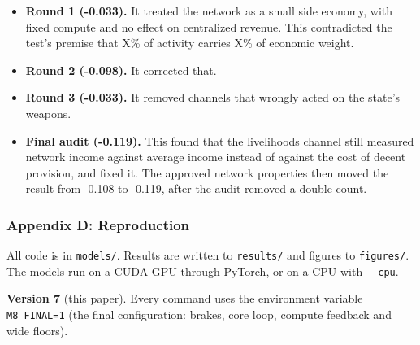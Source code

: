 \documentclass[
  10pt,
]{article}
\providecommand{\tightlist}{%
  \setlength{\itemsep}{0pt}\setlength{\parskip}{0pt}}
\begin{document}
\begin{itemize}
\tightlist
\item
  \textbf{Round 1 (-0.033).} It treated the network as a small side economy, with fixed compute and
  no effect on centralized revenue. This contradicted the test's premise that X\% of activity
  carries X\% of economic weight.
\item
  \textbf{Round 2 (-0.098).} It corrected that.
\item
  \textbf{Round 3 (-0.033).} It removed channels that wrongly acted on the state's weapons.
\item
  \textbf{Final audit (-0.119).} This found that the livelihoods channel still measured network
  income against average income instead of against the cost of decent provision, and fixed it. The
  approved network properties then moved the result from -0.108 to -0.119, after the audit removed a
  double count.
\end{itemize}

\subsubsection{Appendix D: Reproduction}\label{appendix-d-reproduction}

All code is in \texttt{models/}. Results are written to \texttt{results/} and figures to
\texttt{figures/}. The models run on a CUDA GPU through PyTorch, or on a CPU with \texttt{-\/-cpu}.

\textbf{Version 7} (this paper). Every command uses the environment variable \texttt{M8\_FINAL=1}
(the final configuration: brakes, core loop, compute feedback and wide floors).
\end{document}

